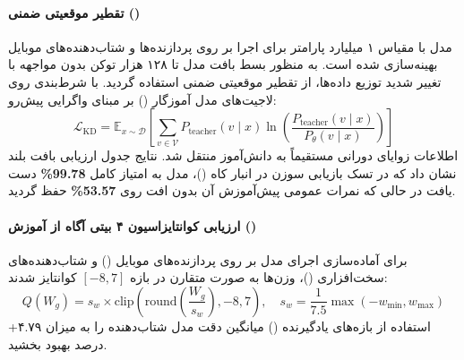 \item {}

\paragraph*{تقطیر موقعیتی ضمنی ()}
مدل  \cite{mobilellmpro2025} با مقیاس ۱ میلیارد پارامتر برای اجرا بر روی پردازنده‌ها و شتاب‌دهنده‌های موبایل بهینه‌سازی شده است. به منظور بسط بافت مدل تا ۱۲۸ هزار توکن بدون مواجهه با تغییر شدید توزیع داده‌ها، از تقطیر موقعیتی ضمنی استفاده گردید. با شرط‌بندی روی لاجیت‌های مدل آموزگار () بر مبنای واگرایی  پیش‌رو:
\begin{equation}
    \mathcal{L}_{\mathrm{KD}} = \mathbb{E}_{x \sim \mathcal{D}} \left[ \sum_{v \in \mathcal{V}} P_{\text{teacher}}(v \mid x) \ln \left(\frac{P_{\text{teacher}}(v \mid x)}{P_\theta(v \mid x)}\right) \right]
\end{equation}
اطلاعات زوایای دورانی  مستقیماً به دانش‌آموز منتقل شد. نتایج جدول ارزیابی بافت بلند نشان داد که در تسک بازیابی سوزن در انبار کاه ()، مدل به امتیاز کامل \textbf{99.78\%} دست یافت در حالی که نمرات عمومی پیش‌آموزش آن بدون افت روی \textbf{53.57\%} حفظ گردید.

\paragraph*{ارزیابی کوانتایزاسیون ۴ بیتی آگاه از آموزش ()}
برای آماده‌سازی اجرای مدل بر روی پردازنده‌های موبایل () و شتاب‌دهنده‌های سخت‌افزاری ()، وزن‌ها به صورت متقارن در بازه $[-8, 7]$ کوانتایز شدند:
\begin{equation}
    Q(W_g) = s_w \times \text{clip}\left( \text{round}\left(\frac{W_g}{s_w}\right), -8, 7 \right), \quad s_w = \frac{1}{7.5} \max(-w_{\min}, w_{\max})
\end{equation}
استفاده از بازه‌های یادگیرنده () میانگین دقت مدل شتاب‌دهنده را به میزان ۴.۷۹+ درصد بهبود بخشید. 

